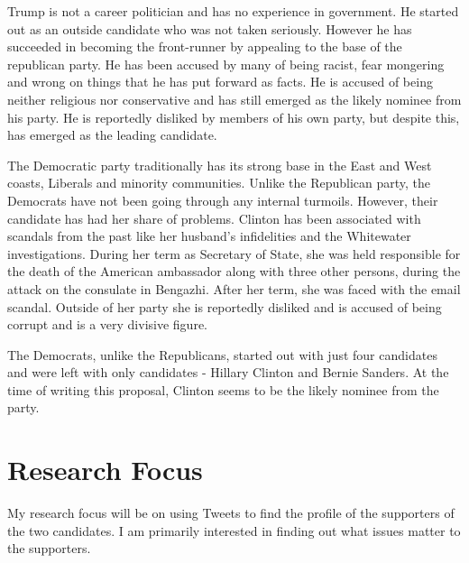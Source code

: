 \documentclass{sig-alternate-05-2015}
\begin{document}
Trump is not a career politician and has no experience in government. He started out as an outside candidate who was not taken seriously. However he has succeeded in becoming the front-runner by appealing to the base of the republican party. He has been accused by many of being racist, fear mongering and wrong on things that he has put forward as facts. He is accused of being neither religious nor conservative and has still emerged as the likely nominee from his party. He is reportedly disliked by members of his own party, but despite this, has emerged as the leading candidate.

The Democratic party traditionally has its strong base in the East and West coasts, Liberals and minority communities. Unlike the Republican party, the Democrats have not been going through any internal turmoils. However, their candidate has had her share of problems. Clinton has been associated with scandals from the past like her husband's infidelities and the Whitewater investigations. During her term as Secretary of State, she was held responsible for the death of the American ambassador along with three other persons, during the attack on the consulate in Bengazhi. After her term, she was faced with the email scandal. Outside of her party she is reportedly disliked and is accused of being corrupt and is a very divisive figure.

The Democrats, unlike the Republicans, started out with just four candidates and were left with only candidates - Hillary Clinton and Bernie Sanders. At the time of writing this proposal, Clinton seems to be the likely nominee from the party.

\section{Research Focus}

My research focus will be on using Tweets to find the profile of the supporters of the two candidates. I am primarily interested in finding out what issues matter to the supporters. 
\end{document}
